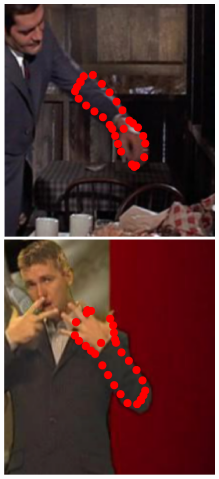 \begin{figure}
    \hfill
    \includegraphics[height=\ofh]{resources/Annotation_Correction/Suplementory_Meterial/ExFit/0003.eps}
    \hfill
    \includegraphics[height=\ofh]{resources/Annotation_Correction/Suplementory_Meterial/ExFit/0004.eps}

\end{figure}

